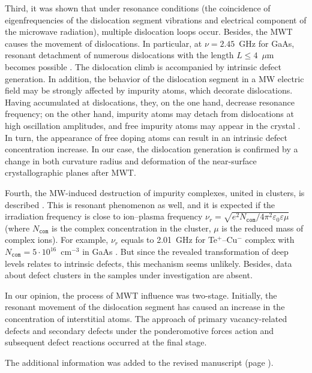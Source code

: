 \documentclass[10pt]{iopart}
\begin{document}
Third, it was shown \cite{MWT:JLumin,Konakova2007JTFEn,Milenin:SPQEO2019} that under resonance conditions
(the coincidence of eigenfrequencies of the dislocation segment vibrations and electrical component of the microwave radiation),
multiple dislocation loops occur.
Besides, the MWT causes the  movement of dislocations.
In particular, at $\nu=2.45$~GHz for GaAs, resonant detachment
of numerous dislocations with the length $L\leq4$~$\mu$m becomes possible \cite{Milenin:SPQEO2019}.
The dislocation climb is accompanied by intrinsic defect generation.
In addition, the behavior of the dislocation segment in a MW electric field may be strongly affected by
impurity atoms, which decorate dislocations.
Having accumulated at dislocations, they, on the one hand,
decrease resonance frequency;
on the other hand, impurity atoms may detach from dislocations at
high oscillation amplitudes, and free impurity atoms may appear in the crystal \cite{MWT:JLumin,Konakova2007JTFEn}.
In turn, the appearance of free doping atoms can result in an intrinsic defect concentration increase.
In our case, the dislocation generation is confirmed by a change in both curvature radius and
deformation of the near-surface crystallographic planes after MWT.

Fourth, the MW-induced destruction of impurity complexes, united in clusters,
is described \cite{MWT:JLumin,Konakova2007JTFEn,Milenin:SPQEO2019}.
This is resonant phenomenon as well, and it is expected if the
irradiation frequency is close to ion--plasma frequency
$\nu_r=\sqrt{e^2N_\mathtt{com}/4\pi^2\varepsilon_0\varepsilon\mu}$
(where
$N_\mathtt{com}$ is the complex concentration in the cluster,
$\mu$ is the reduced mass of complex ions).
For example, $\nu_r$ equals to 2.01~GHz for
Te$^+$--Cu$^-$ complex with $N_\mathtt{com}=5\cdot10^{16}$~cm$^{-3}$
in GaAs \cite{MWT:JLumin}.
But since the revealed transformation of deep levels
relates to intrinsic defects, this mechanism seems unlikely.
Besides, data about defect clusters in the samples under investigation are absent.

In our opinion, the process of MWT influence was two-stage.
Initially, the resonant movement of the dislocation segment
has caused an increase in the concentration of interstitial atoms.
The approach of primary vacancy-related defects and secondary defects under
the ponderomotive forces action and subsequent defect reactions occurred at the final stage.

The additional information was added to the revised manuscript
(page ).
\end{document}

